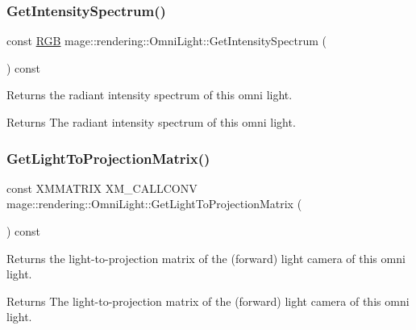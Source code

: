\subsubsection{\texorpdfstring{Get\+Intensity\+Spectrum()}{GetIntensitySpectrum()}}
{\footnotesize\ttfamily const \mbox{\hyperlink{structmage_1_1_r_g_b}{R\+GB}} mage\+::rendering\+::\+Omni\+Light\+::\+Get\+Intensity\+Spectrum (\begin{DoxyParamCaption}{ }\end{DoxyParamCaption}) const\hspace{0.3cm}{\ttfamily [noexcept]}}

Returns the radiant intensity spectrum of this omni light.

\begin{DoxyReturn}{Returns}
The radiant intensity spectrum of this omni light. 
\end{DoxyReturn}
\mbox{\label{classmage_1_1rendering_1_1_omni_light_aa93d9722b3480fc9997761af89a6d90d}} 
\subsubsection{\texorpdfstring{Get\+Light\+To\+Projection\+Matrix()}{GetLightToProjectionMatrix()}}
{\footnotesize\ttfamily const X\+M\+M\+A\+T\+R\+IX X\+M\+\_\+\+C\+A\+L\+L\+C\+O\+NV mage\+::rendering\+::\+Omni\+Light\+::\+Get\+Light\+To\+Projection\+Matrix (\begin{DoxyParamCaption}{ }\end{DoxyParamCaption}) const\hspace{0.3cm}{\ttfamily [noexcept]}}

Returns the light-\/to-\/projection matrix of the (forward) light camera of this omni light.

\begin{DoxyReturn}{Returns}
The light-\/to-\/projection matrix of the (forward) light camera of this omni light. 
\end{DoxyReturn}
\mbox{\label{classmage_1_1rendering_1_1_omni_light_a43c6be5649668705ffb1ace363960b00}} 
